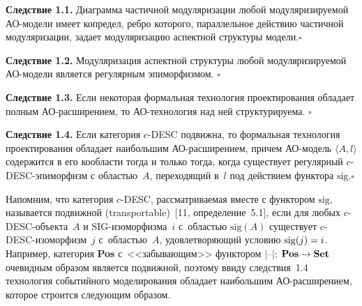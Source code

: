 \begin{multicols}{2}
 \noindent
 \textbf{Следствие 1.1.} Диаграмма частичной модуляризации любой
модуляризируемой АО-мо\-де\-ли имеет копредел, ребро которого,
параллельное действию частичной модуляризации, задает модуляризацию
аспектной структуры модели.\hfill$\square$

 \smallskip

 \noindent
 \textbf{Следствие 1.2.} Модуляризация аспектной структуры любой
модуляризируемой АО-мо\-де\-ли является регулярным эпиморфизмом.
\hfill$\square$

 \smallskip

 \noindent
 \textbf{Следствие 1.3.} Если некоторая формальная технология
проектирования обладает полным АО-рас\-ши\-ре\-ни\-ем, то
 АО-тех\-но\-ло\-гия над ней структурируема. \hfill$\square$

 \smallskip


 \noindent
 \textbf{Следствие 1.4.} Если категория $c$-DESC подвижна, то
формальная технология проектирования обладает наибольшим
 АО-рас\-ши\-ре\-ни\-ем, причем АО-мо\-дель $\langle A, l\rangle$ содержится
в его кообласти тогда и только тогда, когда существует регулярный
 $c$-DESC-эпи\-мор\-физм с областью~$A$, переходящий в~$l$ под
действием функтора $\mathrm{sig}$.\hfill$\square$

 \smallskip

 Напомним, что категория $c$-DESC, рассматриваемая вместе с функтором
$\mathrm{sig}$, называется подвижной (transportable)~[11, определение~5.1], если для
любых $c$-DESC-объ\-ек\-та~$A$ и $\mathrm{SIG}$-изо\-мор\-физ\-ма~$i$
 с~об\-ластью $\mathrm{sig}(A)$ существует $c$-DESC-изо\-мор\-физм~$j$
 с~об\-ластью~$A$, удовлетворяющий условию $\mathrm{sig}(j) \hm= i$. Например,
категория \textbf{Pos} с~<<забывающим>> функтором $\vert \mbox{--}\vert$:
$\mathbf{Pos}\hm\to\mathbf{Set}$ очевидным образом является подвижной,
поэтому ввиду следствия~1.4 технология событийного моделирования обладает
наибольшим АО-рас\-ши\-ре\-ни\-ем, которое строится следующим образом.


\end{multicols}
